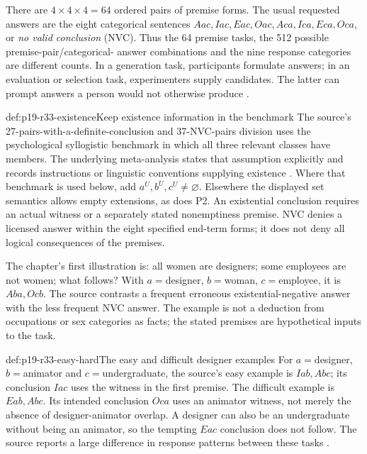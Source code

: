 There are \(4\times4\times4=64\) ordered pairs of premise forms.
The usual requested answers are the eight categorical sentences
\(Aac,Iac,Eac,Oac,Aca,Ica,Eca,Oca\), or \emph{no valid conclusion}
(NVC). Thus the 64 premise tasks, the 512 possible premise-pair/categorical-
answer combinations and the nine response categories are different counts.
In a generation task, participants formulate answers; in an evaluation or
selection task, experimenters supply candidates. The latter can prompt
answers a person would not otherwise produce
\cite[pp.~226--227]{Khemlani2021Syllogistic}.

\begin{hbconvention}{def:p19-r33-existence}{Keep existence information in the benchmark}
The source's 27-pairs-with-a-definite-conclusion and 37-NVC-pairs division
uses the psychological syllogistic benchmark in which all three relevant
classes have members. The underlying meta-analysis states that assumption
explicitly and records instructions or linguistic conventions supplying
existence \cite[pp.~3--4 of the advance-online text]
{KhemlaniJohnsonLaird2012SyllogismMeta}.
Where that benchmark is used below, add
\(a^U,b^U,c^U\ne\varnothing\). Elsewhere the displayed set semantics
allows empty extensions, as does P2. An existential conclusion requires an
actual witness or a separately stated nonemptiness premise.
NVC denies a licensed answer within the eight specified end-term forms;
it does not deny all logical consequences of the premises.
\end{hbconvention}

The chapter's first illustration is: all women are designers; some employees
are not women; what follows? With \(a=\)designer, \(b=\)woman,
\(c=\)employee, it is \(Aba,Ocb\). The source contrasts a frequent
erroneous existential-negative answer with the less frequent NVC answer.
The example is not a deduction from occupations or sex categories as facts;
the stated premises are hypothetical inputs to the task.

\begin{hbexample}{def:p19-r33-easy-hard}{The easy and difficult designer examples}
For \(a=\)designer, \(b=\)animator and \(c=\)undergraduate,
the source's easy example is \(Iab,Abc\); its conclusion \(Iac\)
uses the witness in the first premise. The difficult example is
\(Eab,Abc\). Its intended conclusion \(Oca\) uses an animator
witness, not merely the absence of designer-animator overlap.
A designer can also be an undergraduate without being an animator, so
the tempting \(Eac\) conclusion does not follow. The source reports a
large difference in response patterns between these tasks
\cite[pp.~226--228]{Khemlani2021Syllogistic}.
\end{hbexample}


